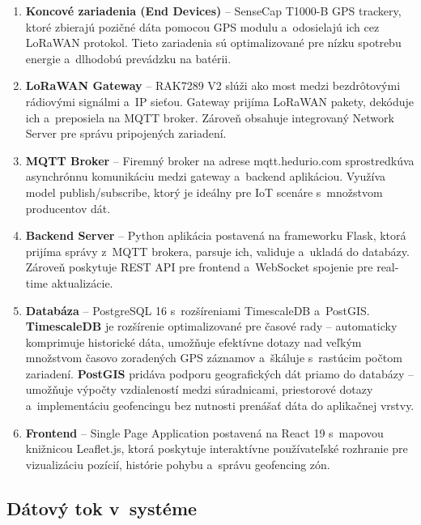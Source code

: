 \begin{enumerate}
    \item \textbf{Koncové zariadenia (End Devices)} -- SenseCap T1000-B GPS trackery, ktoré zbierajú pozičné dáta pomocou GPS modulu a~odosielajú ich cez LoRaWAN protokol. Tieto zariadenia sú optimalizované pre nízku spotrebu energie a~dlhodobú prevádzku na batérii.

    \item \textbf{LoRaWAN Gateway} -- RAK7289 V2 slúži ako most medzi bezdrôtovými rádiovými signálmi a~IP sieťou. Gateway prijíma LoRaWAN pakety, dekóduje ich a~preposiela na MQTT broker. Zároveň obsahuje integrovaný Network Server pre správu pripojených zariadení.

    \item \textbf{MQTT Broker} -- Firemný broker na adrese mqtt.hedurio.com sprostredkúva asynchrónnu komunikáciu medzi gateway a~backend aplikáciou. Využíva model publish/subscribe, ktorý je ideálny pre IoT scenáre s~množstvom producentov dát.

    \item \textbf{Backend Server} -- Python aplikácia postavená na frameworku Flask, ktorá prijíma správy z~MQTT brokera, parsuje ich, validuje a~ukladá do databázy. Zároveň poskytuje REST API pre frontend a~WebSocket spojenie pre real-time aktualizácie.

    \item \textbf{Databáza} -- PostgreSQL 16 s~rozšíreniami TimescaleDB a~PostGIS. \textbf{TimescaleDB} je rozšírenie optimalizované pre časové rady -- automaticky komprimuje historické dáta, umožňuje efektívne dotazy nad veľkým množstvom časovo zoradených GPS záznamov a~škáluje s~rastúcim počtom zariadení. \textbf{PostGIS} pridáva podporu geografických dát priamo do databázy -- umožňuje výpočty vzdialeností medzi súradnicami, priestorové dotazy a~implementáciu geofencingu bez nutnosti prenášať dáta do aplikačnej vrstvy.

    \item \textbf{Frontend} -- Single Page Application postavená na React 19 s~mapovou knižnicou Leaflet.js, ktorá poskytuje interaktívne používateľské rozhranie pre vizualizáciu pozícií, histórie pohybu a~správu geofencing zón.
\end{enumerate}

\subsection{Dátový tok v~systéme}
\label{sec:DatovyTok}

